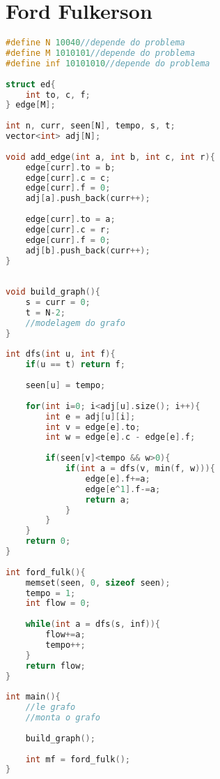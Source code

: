 \documentclass[12pt,a4paper,twoside]{report}
\begin{document}
\section{Ford Fulkerson}
\noindent\begin{lstlisting}[caption=Ford Fulkerson,language=C++]
#define N 10040//depende do problema
#define M 1010101//depende do problema
#define inf 10101010//depende do problema
 
struct ed{
    int to, c, f;
} edge[M];
 
int n, curr, seen[N], tempo, s, t;
vector<int> adj[N];
 
void add_edge(int a, int b, int c, int r){  
    edge[curr].to = b;
    edge[curr].c = c;
    edge[curr].f = 0;
    adj[a].push_back(curr++);
     
    edge[curr].to = a;
    edge[curr].c = r;
    edge[curr].f = 0;
    adj[b].push_back(curr++);
}
 
 
void build_graph(){
    s = curr = 0;
    t = N-2;
    //modelagem do grafo
}
 
int dfs(int u, int f){  
    if(u == t) return f;
     
    seen[u] = tempo;
     
    for(int i=0; i<adj[u].size(); i++){
        int e = adj[u][i];
        int v = edge[e].to;
        int w = edge[e].c - edge[e].f;
         
        if(seen[v]<tempo && w>0){
            if(int a = dfs(v, min(f, w))){
                edge[e].f+=a;
                edge[e^1].f-=a;
                return a;
            }
        }
    }
    return 0;
}
 
int ford_fulk(){  
    memset(seen, 0, sizeof seen);
    tempo = 1;
    int flow = 0;
     
    while(int a = dfs(s, inf)){
        flow+=a;
        tempo++;
    }
    return flow;
}
 
int main(){
    //le grafo    
    //monta o grafo
     
    build_graph();
     
    int mf = ford_fulk();
}
\end{lstlisting}
\end{document}
